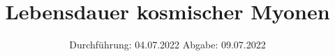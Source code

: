 

\subject{V01}
\title{Lebensdauer kosmischer Myonen}
\date{%
  Durchführung: 04.07.2022
  \hspace{3em}
  Abgabe: 09.07.2022
}



\maketitle
\thispagestyle{empty}
\tableofcontents
\newpage







\nocite{*}
\printbibliography{}


